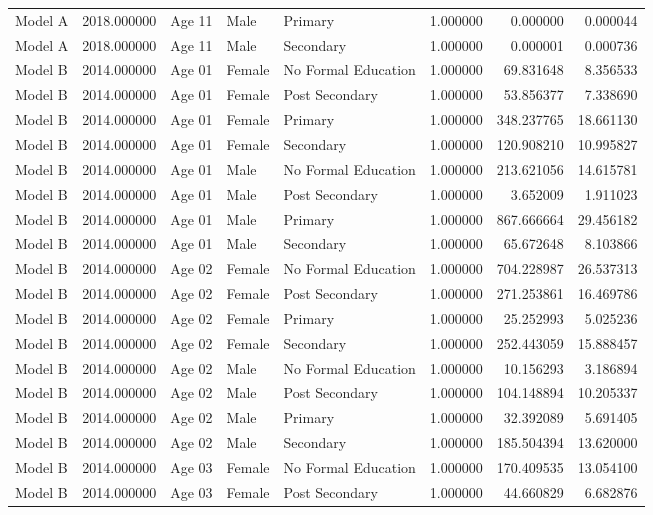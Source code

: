 \begin{table}[ht]
\begin{tabular}{lrlllrrr}
Model A & 2018.000000 & Age 11 & Male & Primary & 1.000000 & 0.000000 & 0.000044 \\
Model A & 2018.000000 & Age 11 & Male & Secondary & 1.000000 & 0.000001 & 0.000736 \\
Model B & 2014.000000 & Age 01 & Female & No Formal Education & 1.000000 & 69.831648 & 8.356533 \\
Model B & 2014.000000 & Age 01 & Female & Post Secondary & 1.000000 & 53.856377 & 7.338690 \\
Model B & 2014.000000 & Age 01 & Female & Primary & 1.000000 & 348.237765 & 18.661130 \\
Model B & 2014.000000 & Age 01 & Female & Secondary & 1.000000 & 120.908210 & 10.995827 \\
Model B & 2014.000000 & Age 01 & Male & No Formal Education & 1.000000 & 213.621056 & 14.615781 \\
Model B & 2014.000000 & Age 01 & Male & Post Secondary & 1.000000 & 3.652009 & 1.911023 \\
Model B & 2014.000000 & Age 01 & Male & Primary & 1.000000 & 867.666664 & 29.456182 \\
Model B & 2014.000000 & Age 01 & Male & Secondary & 1.000000 & 65.672648 & 8.103866 \\
Model B & 2014.000000 & Age 02 & Female & No Formal Education & 1.000000 & 704.228987 & 26.537313 \\
Model B & 2014.000000 & Age 02 & Female & Post Secondary & 1.000000 & 271.253861 & 16.469786 \\
Model B & 2014.000000 & Age 02 & Female & Primary & 1.000000 & 25.252993 & 5.025236 \\
Model B & 2014.000000 & Age 02 & Female & Secondary & 1.000000 & 252.443059 & 15.888457 \\
Model B & 2014.000000 & Age 02 & Male & No Formal Education & 1.000000 & 10.156293 & 3.186894 \\
Model B & 2014.000000 & Age 02 & Male & Post Secondary & 1.000000 & 104.148894 & 10.205337 \\
Model B & 2014.000000 & Age 02 & Male & Primary & 1.000000 & 32.392089 & 5.691405 \\
Model B & 2014.000000 & Age 02 & Male & Secondary & 1.000000 & 185.504394 & 13.620000 \\
Model B & 2014.000000 & Age 03 & Female & No Formal Education & 1.000000 & 170.409535 & 13.054100 \\
Model B & 2014.000000 & Age 03 & Female & Post Secondary & 1.000000 & 44.660829 & 6.682876 \\

\end{tabular}
\end{table}
